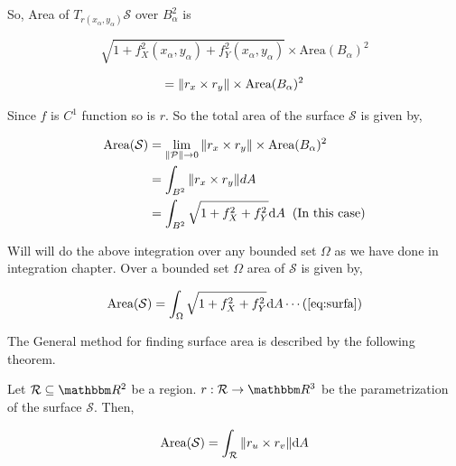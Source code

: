 \documentclass[../Analysis-3]{subfiles}
\begin{document}
So, Area of $T_{r(x_{\alpha},y_{\alpha})} \mathcal{S}$ over $B_{\alpha}^2$ is

$$\sqrt{1 + f_X^2(x_{\alpha},y_{\alpha}) + f_Y^2(x_{\alpha},y_{\alpha})} \times \text{Area}(B_{\alpha})^2$$

$$ = \norm{r_x \times r_y} \times \text{Area}(B_{\alpha})^2$$

\pagebreak

Since $f$ is $C^1$ function so is $r$. So the total area of the surface $\mathcal{S}$ is given by,

\begin{align*}
    \text{Area} (\mathcal{S}) & = \lim_{\norm{\mathcal{P}} \to 0} \norm{r_x \times r_y} \times \text{Area}(B_{\alpha})^2 \\
                              & = \int_{B^2} \norm{r_x \times r_y} dA                                                    \\
                              & = \int_{B^2} \sqrt{1 + f_X^2 +f_Y^2} \dd A \hspace{0.2cm}(\text{In this case})
\end{align*}

Will will do the above integration over any bounded set $\Omega$ as we have done in  integration chapter. Over a bounded set $\Omega$ area of $\mathcal{S}$ is given by,

\[\text{Area} (\mathcal{S}) =  \int_{\Omega} \sqrt{1 + f_X^2 +f_Y^2} \dd A \label{eq:surfa} \cdots  (\ref{eq:surfa})\]

The General method for finding surface area is described by the following theorem.

\begin{Thm}{}{}
    Let $\mathcal{R} \subseteq \R^2$ be a region. $r : \mathcal{R} \to \R^3$ be the parametrization of the surface $\mathcal{S}$. Then,

    \[\text{Area}(\mathcal{S}) = \int_{\mathcal{R}} \norm{r_u \times r_v} \dd A\]
\end{Thm}
\end{document}
